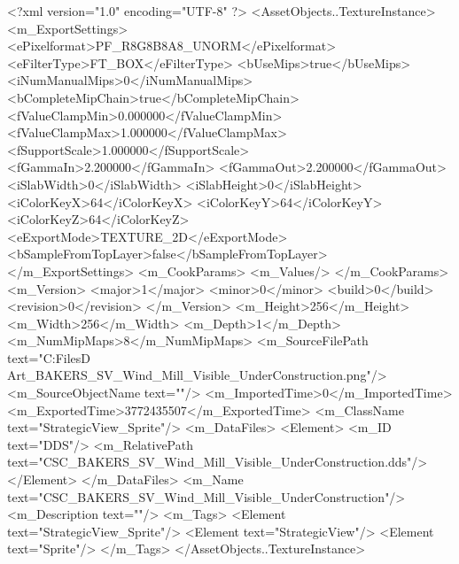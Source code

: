 <?xml version="1.0" encoding="UTF-8" ?>
<AssetObjects..TextureInstance>
	<m_ExportSettings>
		<ePixelformat>PF_R8G8B8A8_UNORM</ePixelformat>
		<eFilterType>FT_BOX</eFilterType>
		<bUseMips>true</bUseMips>
		<iNumManualMips>0</iNumManualMips>
		<bCompleteMipChain>true</bCompleteMipChain>
		<fValueClampMin>0.000000</fValueClampMin>
		<fValueClampMax>1.000000</fValueClampMax>
		<fSupportScale>1.000000</fSupportScale>
		<fGammaIn>2.200000</fGammaIn>
		<fGammaOut>2.200000</fGammaOut>
		<iSlabWidth>0</iSlabWidth>
		<iSlabHeight>0</iSlabHeight>
		<iColorKeyX>64</iColorKeyX>
		<iColorKeyY>64</iColorKeyY>
		<iColorKeyZ>64</iColorKeyZ>
		<eExportMode>TEXTURE_2D</eExportMode>
		<bSampleFromTopLayer>false</bSampleFromTopLayer>
	</m_ExportSettings>
	<m_CookParams>
		<m_Values/>
	</m_CookParams>
	<m_Version>
		<major>1</major>
		<minor>0</minor>
		<build>0</build>
		<revision>0</revision>
	</m_Version>
	<m_Height>256</m_Height>
	<m_Width>256</m_Width>
	<m_Depth>1</m_Depth>
	<m_NumMipMaps>8</m_NumMipMaps>
	<m_SourceFilePath text="C:\Users\Shadow\Desktop\Working Files\2D Art\Quarters\Bakers\StrategicView\CSC_BAKERS_SV_Wind_Mill_Visible_UnderConstruction.png"/>
	<m_SourceObjectName text=""/>
	<m_ImportedTime>0</m_ImportedTime>
	<m_ExportedTime>3772435507</m_ExportedTime>
	<m_ClassName text="StrategicView_Sprite"/>
	<m_DataFiles>
		<Element>
			<m_ID text="DDS"/>
			<m_RelativePath text="CSC_BAKERS_SV_Wind_Mill_Visible_UnderConstruction.dds"/>
		</Element>
	</m_DataFiles>
	<m_Name text="CSC_BAKERS_SV_Wind_Mill_Visible_UnderConstruction"/>
	<m_Description text=""/>
	<m_Tags>
		<Element text="StrategicView_Sprite"/>
		<Element text="StrategicView"/>
		<Element text="Sprite"/>
	</m_Tags>
</AssetObjects..TextureInstance>

